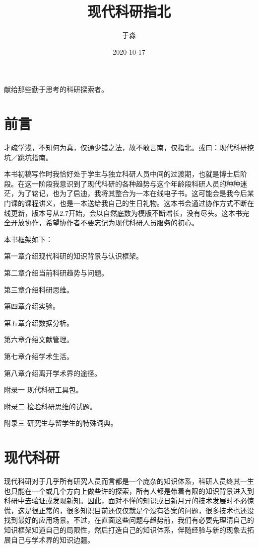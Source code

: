 \documentclass[]{tufte-book}
\title{现代科研指北}
\author{于淼}
\date{2020-10-17}
\begin{document}
\maketitle



{
\setcounter{tocdepth}{1}
\tableofcontents
}

献给那些勤于思考的科研探索者。

\hypertarget{ux524dux8a00}{%
\chapter{前言}\label{ux524dux8a00}}

才疏学浅，不知何为真，仅通少错之法，故不敢言南，仅指北。或曰：现代科研挖坑／跳坑指南。

本书初稿写作时我恰好处于学生与独立科研人员中间的过渡期，也就是博士后阶段。在这一阶段我意识到了现代科研的各种趋势与这个年龄段科研人员的种种迷茫，为了铭记，也为了启迪，我将其整合为一本在线电子书。这可能会是我今后某门课的课程讲义，也是一本送给我自己的生日礼物。这本书会通过协作方式不断在线更新，版本号从2.7开始，会以自然底数为模版不断增长，没有尽头。这本书完全开放协作，希望协作者不要忘记为现代科研人员服务的初心。

本书框架如下：

第一章介绍现代科研的知识背景与认识框架。

第二章介绍当前科研趋势与问题。

第三章介绍科研思维。

第四章介绍实验。

第五章介绍数据分析。

第六章介绍文献管理。

第七章介绍学术生活。

第八章介绍离开学术界的途径。

附录一 现代科研工具包。

附录二 检验科研思维的试题。

附录三 研究生与留学生的特殊词典。

\hypertarget{intro}{%
\chapter{现代科研}\label{intro}}

现代科研对于几乎所有研究人员而言都是一个庞杂的知识体系，科研人员终其一生也只能在一个或几个方向上做些许的探索，所有人都是带着有限的知识背景进入到科研中去验证或发现新知。因此，面对不懂的知识或日新月异的技术发展时不必惊慌，这是很正常的，很多知识目前还仅仅就是个没有答案的问题，很多技术也还没找到最好的应用场景。不过，在直面这些问题与趋势前，我们有必要先理清自己的知识框架知道自己的局限性，然后打造自己的知识体系，伴随经验与新的现象去拓展自己与学术界的知识边疆。
\end{document}
